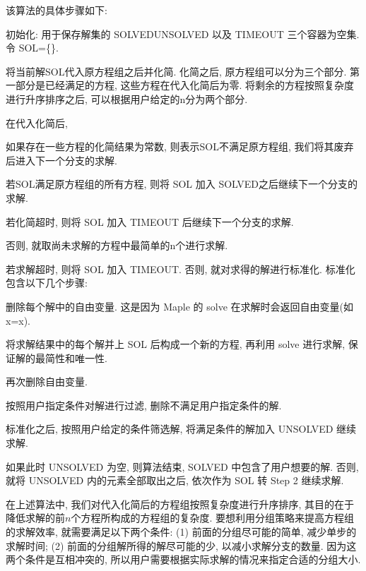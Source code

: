 该算法的具体步骤如下:
\begin{compactenum}[Step 1.]
\item 初始化: 用于保存解集的 SOLVED\D UNSOLVED 以及 TIMEOUT 三个容器为空集. 令 SOL=\{\}. 
\item 将当前解SOL代入原方程组之后并化简. 化简之后, 原方程组可以分为三个部分. 第一部分是已经满足的方程, 这些方程在代入化简后为零. 将剩余的方程按照复杂度进行升序排序之后, 可以根据用户给定的n分为两个部分. 
\item 在代入化简后, 
    \begin{compactenum}[(a)]
    \item 如果存在一些方程的化简结果为常数, 则表示SOL不满足原方程组, 我们将其废弃后进入下一个分支的求解. 
    \item 若SOL满足原方程组的所有方程, 则将 SOL 加入 SOLVED之后继续下一个分支的求解. 
    \item 若化简超时, 则将 SOL 加入 TIMEOUT 后继续下一个分支的求解. 
    \item 否则, 就取尚未求解的方程中最简单的n个进行求解.
    \end{compactenum}
\item 若求解超时, 则将 SOL 加入 TIMEOUT. 否则, 就对求得的解进行标准化. 标准化包含以下几个步骤:
    \begin{compactenum}[(1)]
    \item 删除每个解中的自由变量. 这是因为 Maple 的 solve 在求解时会返回自由变量(如 x=x).
    \item 将求解结果中的每个解并上 SOL 后构成一个新的方程, 再利用 solve 进行求解, 保证解的最简性和唯一性. 
    \item 再次删除自由变量.
    \item 按照用户指定条件对解进行过滤, 删除不满足用户指定条件的解. 
    \end{compactenum}
\item 标准化之后, 按照用户给定的条件筛选解, 将满足条件的解加入 UNSOLVED 继续求解. 
\item 如果此时 UNSOLVED 为空, 则算法结束, SOLVED 中包含了用户想要的解. 否则, 就将 UNSOLVED 内的元素全部取出之后, 依次作为 SOL 转 Step 2 继续求解. 
\end{compactenum}

在上述算法中, 我们对代入化简后的方程组按照复杂度进行升序排序, 其目的在于降低求解的前$n$个方程所构成的方程组的复杂度.  要想利用分组策略来提高方程组的求解效率, 就需要满足以下两个条件: (1) 前面的分组尽可能的简单, 减少单步的求解时间; (2) 前面的分组解所得的解尽可能的少, 以减小求解分支的数量. 因为这两个条件是互相冲突的, 所以用户需要根据实际求解的情况来指定合适的分组大小. 

